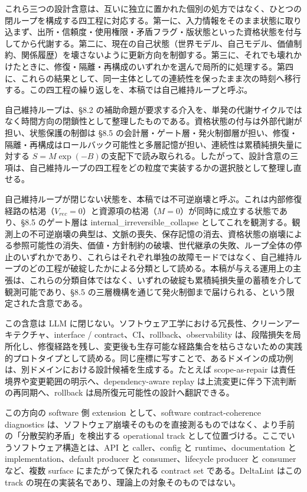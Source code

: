 \documentclass[12pt,a4paper]{article}
\begin{document}
これら三つの設計含意は、互いに独立に置かれた個別の処方ではなく、ひとつの閉ループを構成する四工程に対応する。第一に、入力情報をそのまま状態に取り込まず、出所・信頼度・使用権限・矛盾フラグ・版状態といった資格状態を付与してから代謝する。第二に、現在の自己状態（世界モデル、自己モデル、価値制約、関係履歴）を壊さないように更新方向を制御する。第三に、それでも壊れかけたときに、修復・隔離・再構成のいずれかを選んで局所的に処理する。第四に、これらの結果として、同一主体としての連続性を保ったまま次の時刻へ移行する。この四工程の繰り返しを、本稿では自己維持ループと呼ぶ。

自己維持ループは、§8.2 の補助命題が要求する介入を、単発の代謝サイクルではなく時間方向の閉鎖性として整理したものである。資格状態の付与は外部代謝が担い、状態保護の制御は §8.5 の会計層・ゲート層・発火制御層が担い、修復・隔離・再構成はロールバック可能性と多層記憶が担い、連続性は累積純損失量に対する \(S = M \exp(-B)\)の支配下で読み取られる。したがって、設計含意の三項は、自己維持ループの四工程をどの粒度で実装するかの選択肢として整理し直せる。

自己維持ループが閉じない状態を、本稿では不可逆崩壊と呼ぶ。これは内部修復経路の枯渇（\(V_{rec} = 0\)）と資源項の枯渇（\(M = 0\)）が同時に成立する状態であり、§8.5 のゲート層は internal\_irreversible\_collapse としてこれを観測する。観測上の不可逆崩壊の典型は、文脈の喪失、保存記憶の消去、資格状態の崩壊による参照可能性の消失、価値・方針制約の破壊、世代継承の失敗、ループ全体の停止のいずれかであり、これらはそれぞれ単独の故障モードではなく、自己維持ループのどの工程が破綻したかによる分類として読める。本稿が与える運用上の主張は、これらの分類自体ではなく、いずれの破綻も累積純損失量の蓄積を介して観測可能であり、§8.5 の三層機構を通じて発火制御まで届けられる、という限定された含意である。

この含意は LLM に閉じない。ソフトウェア工学における冗長性、クリーンアーキテクチャ、interface / contract、CI、rollback、observability は、段階損失を局所化し、修復経路を残し、変更後も生存可能な経路集合を枯らさないための実践的プロトタイプとして読める。同じ座標に写すことで、あるドメインの成功例は、別ドメインにおける設計候補を生成する。たとえば scope-as-repair は責任境界や変更範囲の明示へ、dependency-aware replay は上流変更に伴う下流判断の再同期へ、rollback は局所復元可能性の設計へ翻訳できる。

この方向の software 側 extension として、software contract-coherence diagnostics は、ソフトウェア崩壊そのものを直接測るものではなく、より手前の「分散契約矛盾」を検出する operational track として位置づける。ここでいうソフトウェア構造とは、API と caller、config と runtime、documentation と implementation、default producer と consumer、lifecycle producer と consumer など、複数 surface にまたがって保たれる contract set である。DeltaLint はこの track の現在の実装名であり、理論上の対象そのものではない。
\end{document}
